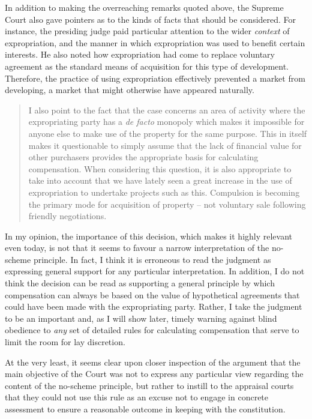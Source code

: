 In addition to making the overreaching remarks quoted above, the Supreme Court also gave pointers as to the kinds of facts that should be considered. For instance, the presiding judge paid particular attention to the wider \emph{context} of expropriation, and the manner in which expropriation was used to benefit certain interests. He also noted how expropriation had come to replace voluntary agreement as the standard means of acquisition for this type of development. Therefore, the practice of using expropriation effectively prevented a market from developing, a market that might otherwise have appeared naturally.

\begin{quote}
I also point to the fact that the case concerns an area of activity where the expropriating party has a {\it de facto} monopoly which makes it impossible for anyone else to make use of the property for the same purpose. This in itself makes it questionable to simply assume that the lack of financial value for other purchasers provides the appropriate basis for calculating compensation. When considering this question, it is also appropriate to take into account that we have lately seen a great increase in the use of expropriation to undertake projects such as this. Compulsion is becoming the primary mode for acquisition of property -- not voluntary sale following friendly negotiations.
\end{quote} 

In my opinion, the importance of this decision, which makes it highly relevant even today, is not that it seems to favour a narrow interpretation of the no-scheme principle. In fact, I think it is erroneous to read the judgment as expressing general support for any particular interpretation. In addition, I do not think the decision can be read as supporting a general principle by which compensation can always be based on the value of hypothetical agreements that could have been made with the expropriating party. Rather, I take the judgment to be an important and, as I will show later, timely warning against blind obedience to \emph{any} set of detailed rules for calculating compensation that serve to limit the room for lay discretion. 

At the very least, it seems clear upon closer inspection of the argument that the main objective of the Court was not to express any particular view regarding the content of the no-scheme principle, but rather to instill to the appraisal courts that they could not use this rule as an excuse not to engage in concrete assessment to ensure a reasonable outcome in keeping with the constitution.

